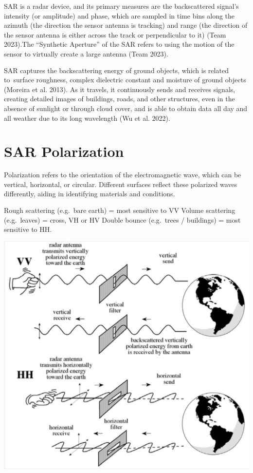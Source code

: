 \documentclass[
  letterpaper,
  DIV=11,
  numbers=noendperiod]{scrreprt}
\begin{document}
SAR is a radar device, and its primary measures are the backscattered
signal's intensity (or amplitude) and phase, which are sampled in time
bins along the azimuth (the direction the sensor antenna is tracking)
and range (the direction of the sensor antenna is either across the
track or perpendicular to it) (Team 2023).The ``Synthetic Aperture'' of
the SAR refers to using the motion of the sensor to virtually create a
large antenna (Team 2023).

SAR captures the backscattering energy of ground objects, which is
related to~surface roughness, complex dielectric constant and moisture
of ground objects (Moreira et al. 2013). As it travels, it continuously
sends and receives signals, creating detailed images of buildings,
roads, and other structures, even in the absence of sunlight or through
cloud cover, and is able to obtain data all day and all weather due to
its long wavelength (Wu et al. 2022).

\section{SAR Polarization}\label{sar-polarization}

Polarization refers to the orientation of the electromagnetic wave,
which can be vertical, horizontal, or circular. Different surfaces
reflect these polarized waves differently, aiding in identifying
materials and conditions.

Rough scattering (e.g.~bare earth) = most sensitive to VV Volume
scattering (e.g.~leaves) = cross, VH or HV Double bounce (e.g.~trees /
buildings) = most sensitive to HH.

\includegraphics{VVHH.png}
\end{document}
